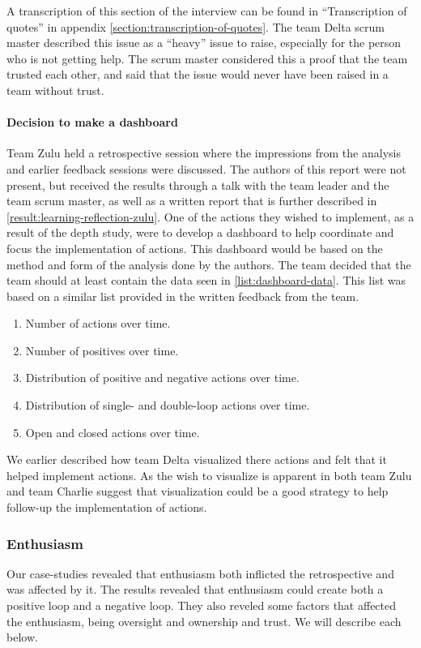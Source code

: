 A transcription of this section of the interview can be found in ``Transcription of quotes'' in appendix \autoref{section:transcription-of-quotes}.
The team Delta scrum master described this issue as a ``heavy'' issue to raise, especially for the person who is not getting help. The scrum master considered this a proof that the team trusted each other, and said that the issue would never have been raised in a team without trust.

\paragraph{Decision to make a dashboard}
\label{dashboard}
Team Zulu held a retrospective session where the impressions from the analysis and earlier feedback sessions were discussed. The authors of this report were not present, but received the results through a talk with the team leader and the team scrum master, as well as a written report that is further described in \autoref{result:learning-reflection-zulu}. One of the actions they wished to implement, as a result of the depth study, were to develop a dashboard to help coordinate and focus the implementation of actions. This dashboard would be based on the method and form of the analysis done by the authors.  The team decided that the team should at least contain the data seen in \autoref{list:dashboard-data}. This list was based on a similar list provided in the written feedback from the team. 

\begin{enumerate}
\label{list:dashboard-data}
\item Number of actions over time.
\item Number of positives over time.
\item Distribution of positive and negative actions over time.
\item Distribution of single- and double-loop actions over time.
\item Open and closed actions over time.
\end{enumerate}

We earlier described how team Delta visualized there actions and felt that it helped implement actions. As the wish to visualize is apparent in both team Zulu and team Charlie suggest that visualization could be a good strategy to help follow-up the implementation of actions. 

\subsubsection{Enthusiasm}
Our case-studies revealed that enthusiasm both inflicted the retrospective and was affected by it. The results revealed that enthusiasm could create both a positive loop and a negative loop. They also reveled some factors that affected the enthusiasm, being oversight and ownership and trust. We will describe each below. 

